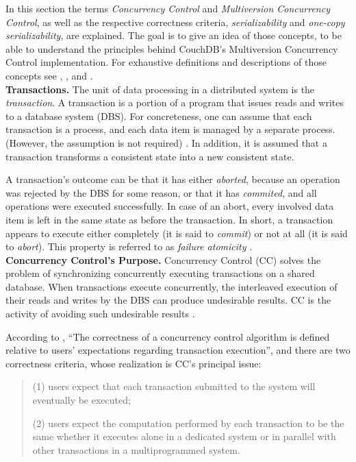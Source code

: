 In this section the terms \emph{Concurrency Control} and \emph{Multiversion Concurrency Control}, as well as the respective correctness criteria, \emph{serializability} and \emph{one-copy serializability}, are explained. The goal is to give an idea of those concepts, to be able to understand the principles behind CouchDB's Multiversion Concurrency Control implementation. For exhaustive definitions and descriptions of those concepts see \cite{Pap79}, \cite{BG81}, and \cite{BG83}.\\

\noindent
{\bf Transactions.}
The unit of data processing in a distributed system is the \emph{transaction}. A transaction is a portion of a program that issues reads and writes to a database system (DBS). For concreteness, one can assume that each transaction is a process, and each data item is managed by a separate process. (However, the assumption is not required) \cite{BG82}. In addition, it is assumed that a transaction transforms a consistent state into a new consistent state.

A transaction's outcome can be that it has either \emph{aborted}, because an operation was rejected by the DBS for some reason, or that it has \emph{commited}, and all operations were executed successfully. In case of an abort, every involved data item is left in the same state as before the transaction. In short, a transaction appears to execute either completely (it is said to \emph{commit}) or not at all (it is said to \emph{abort}). This property is referred to as \emph{failure atomicity} \cite[p.~242f]{GR06}.\\

\noindent
{\bf Concurrency Control's Purpose.}
Concurrency Control (CC) solves the problem of synchronizing concurrently executing transactions on a shared database. When transactions execute concurrently, the interleaved execution of their reads and writes by the DBS can produce undesirable results. CC is the activity of avoiding such undesirable results \cite{BG82}.

According to \cite{BG81}, ``The correctness of a concurrency control algorithm is defined relative to users' expectations regarding transaction execution'', and there are two correctness criteria, whose realization is CC's  principal issue:
\begin{quote}
(1) users expect that each transaction submitted to the system will eventually be executed;

(2) users expect the computation performed by each transaction to be the same whether it executes alone in a dedicated system or in parallel with other transactions in a multiprogrammed system.
\end{quote}

